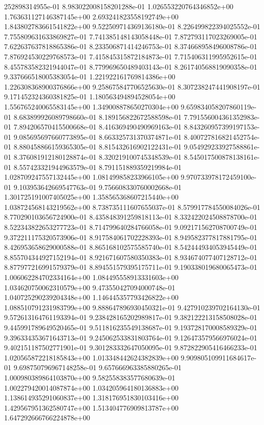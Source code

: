 252898314955e-01	8.983022008158201288e-01	1.026553220764346852e+00	1.763631127146387145e+00	2.693241823558192749e+00	1.843802783661541822e+00	9.522509714369136180e-01	8.226499822394025552e-01	7.755809631633869827e-01	7.741385148143058448e-01	7.872793117023269005e-01	7.622637637818865386e-01	8.233506871414246753e-01	8.374668958496008786e-01	7.876924530229768573e-01	7.415845315872184873e-01	7.715406311995952615e-01	8.455783582321944047e-01	8.779969650489403143e-01	8.261740568819090358e-01	9.337666518005383054e-01	1.221922161769814386e+00	1.226308368900376866e+00	9.258675847706525630e-01	8.307238247441908197e-01	9.171452324360381825e-01	1.180563494894528054e+00	1.556765240065583145e+00	1.349008878650270304e+00	9.659834058207860119e-01	8.683899926089798660e-01	8.189156822672588598e-01	7.791556004361352983e-01	7.894206570415500668e-01	8.416369490490969163e-01	8.843260957399197153e-01	9.085695697660773895e-01	8.663325731370374871e-01	8.400727816821452754e-01	8.880458866159365305e-01	8.815432616902122431e-01	9.054929233927588861e-01	8.376081912180128874e-01	8.320219100745348539e-01	8.545017500878138161e-01	8.557423321944963579e-01	8.791151889359219984e-01	1.028709247557132445e+00	1.081499858233966105e+00	9.970733978172459100e-01	9.103953642669547763e-01	9.756608330760002668e-01	1.301725191007405025e+00	1.358565368607215440e+00	1.038724568143219562e+00	8.738735111607655037e-01	8.579917784550084026e-01	8.770290103656724900e-01	8.435848391259818113e-01	8.332422024508878700e-01	8.522343822653277723e-01	8.714799640284766058e-01	9.092171562708700749e-01	9.372211175320573906e-01	8.917584061702228393e-01	8.949582377817881795e-01	8.426953658629000588e-01	8.865168102575585740e-01	8.542444934053945449e-01	8.855704344927152194e-01	8.921671607580350383e-01	8.934674077407128712e-01	8.877977216991579379e-01	8.894551579395175711e-01	9.190338019680065473e-01	1.006062284702334164e+00	1.084495558913331603e+00	1.034620750062310579e+00	9.473550427094000748e-01	1.040725290239204348e+00	1.146445357793426822e+00	1.088510791231983799e+00	9.888647896930450321e-01	9.427910239702164130e-01	9.572613164761193394e-01	9.238428165202989817e-01	9.382122213158508028e-01	9.445991789649520465e-01	9.511816235549138687e-01	9.193728170008589329e-01	9.396334353671643713e-01	9.245062533831803764e-01	9.126473579566976024e-01	9.402151187502771901e-01	9.301283332647050095e-01	9.872822905416466233e-01	1.020565872218185843e+00	1.013348442624382839e+00	9.909805109911684617e-01	9.698750796967148258e-01	9.657666963385880265e-01	1.000980389864103870e+00	9.582558383577680639e-01	1.002279420014087874e+00	1.034205964180136883e+00	1.138614935291060837e+00	1.318176951830103416e+00	1.429567951362580747e+00	1.513404776909813787e+00	1.647292666766224878e+00
